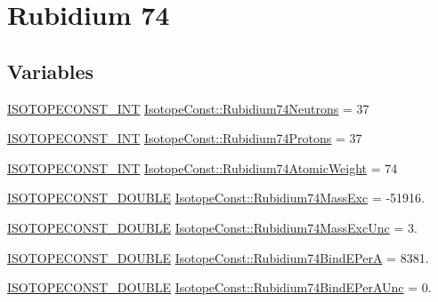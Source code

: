 \hypertarget{group___isotope_const-_rubidium-_rb74}{}\section{Rubidium 74}
\label{group___isotope_const-_rubidium-_rb74}
\subsection*{Variables}
\begin{DoxyCompactItemize}
\item 
\mbox{\hyperlink{group___isotope_const-_macros_ga5f18360b3e99483a35c32d789e62621c}{I\+S\+O\+T\+O\+P\+E\+C\+O\+N\+S\+T\+\_\+\+I\+NT}} \mbox{\hyperlink{group___isotope_const-_rubidium-_rb74_ga1ad68b2d22cb34050f61d0807ac40c2b}{Isotope\+Const\+::\+Rubidium74\+Neutrons}} = 37
\item 
\mbox{\hyperlink{group___isotope_const-_macros_ga5f18360b3e99483a35c32d789e62621c}{I\+S\+O\+T\+O\+P\+E\+C\+O\+N\+S\+T\+\_\+\+I\+NT}} \mbox{\hyperlink{group___isotope_const-_rubidium-_rb74_gafbb216a8766120eacda72fa4f3c6fd52}{Isotope\+Const\+::\+Rubidium74\+Protons}} = 37
\item 
\mbox{\hyperlink{group___isotope_const-_macros_ga5f18360b3e99483a35c32d789e62621c}{I\+S\+O\+T\+O\+P\+E\+C\+O\+N\+S\+T\+\_\+\+I\+NT}} \mbox{\hyperlink{group___isotope_const-_rubidium-_rb74_gaab55691a28fdd0fc22fc492e5da15d46}{Isotope\+Const\+::\+Rubidium74\+Atomic\+Weight}} = 74
\item 
\mbox{\hyperlink{group___isotope_const-_macros_ga8f45a7272ce02c0b4c65c44636ed719a}{I\+S\+O\+T\+O\+P\+E\+C\+O\+N\+S\+T\+\_\+\+D\+O\+U\+B\+LE}} \mbox{\hyperlink{group___isotope_const-_rubidium-_rb74_gadcb070c185ef9291f2c76c43ed71c848}{Isotope\+Const\+::\+Rubidium74\+Mass\+Exc}} = -\/51916.
\item 
\mbox{\hyperlink{group___isotope_const-_macros_ga8f45a7272ce02c0b4c65c44636ed719a}{I\+S\+O\+T\+O\+P\+E\+C\+O\+N\+S\+T\+\_\+\+D\+O\+U\+B\+LE}} \mbox{\hyperlink{group___isotope_const-_rubidium-_rb74_ga244b2687c80c135fd0f00b9d14a681b2}{Isotope\+Const\+::\+Rubidium74\+Mass\+Exc\+Unc}} = 3.
\item 
\mbox{\hyperlink{group___isotope_const-_macros_ga8f45a7272ce02c0b4c65c44636ed719a}{I\+S\+O\+T\+O\+P\+E\+C\+O\+N\+S\+T\+\_\+\+D\+O\+U\+B\+LE}} \mbox{\hyperlink{group___isotope_const-_rubidium-_rb74_ga3e6a800611996167bde3b36f445f5d3a}{Isotope\+Const\+::\+Rubidium74\+Bind\+E\+PerA}} = 8381.
\item 
\mbox{\hyperlink{group___isotope_const-_macros_ga8f45a7272ce02c0b4c65c44636ed719a}{I\+S\+O\+T\+O\+P\+E\+C\+O\+N\+S\+T\+\_\+\+D\+O\+U\+B\+LE}} \mbox{\hyperlink{group___isotope_const-_rubidium-_rb74_gaa6c80d9f6361ef75a78902f05a72d088}{Isotope\+Const\+::\+Rubidium74\+Bind\+E\+Per\+A\+Unc}} = 0.

\end{DoxyCompactItemize}
